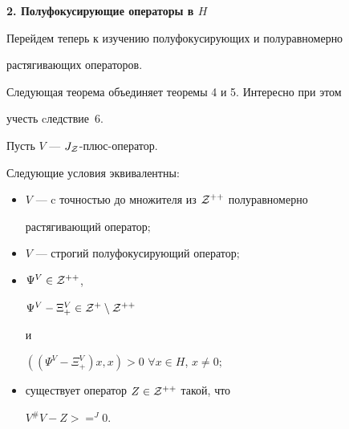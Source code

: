 \begin{center}


{\bf 2. Полуфокусирующие операторы в $H$}


\end{center}


\bigskip





Перейдем теперь к изучению полуфокусирующих и полуравномерно


растягивающих операторов.


Следующая теорема объединяет теоремы 4 и 5. Интересно при этом


учесть cледствие~6.





\begin{thm}


Пусть $V$ --- $J_{\cal Z}$-плюс-оператор.


Следующие условия эквивалентны\/${:}$


\begin{itemize}


\item[i)] $V$ --- c точностью до множителя из ${\cal Z}^{++}$ полуравномерно 


растягивающий оператор$;$


\item[ii)] $V$ --- строгий полуфокусирующий оператор$;$


\item[iii)] $\Psi^{V}\in {\cal Z}^{++}$,


$\Psi^{V}-\Xi^{V}_{+}\in {\cal Z}^{+}\setminus {\cal Z}^{++}$


и


$((\Psi^{V}-\Xi^{V}_{+})x,x)>0$ $\forall x\in H$, $x\ne 0;$


\item[iv)] существует оператор $Z\in {\cal Z}^{++}$ такой, что


$V^{\#}V-Z>=^{J}0$.


\end{itemize}


\end{thm}





